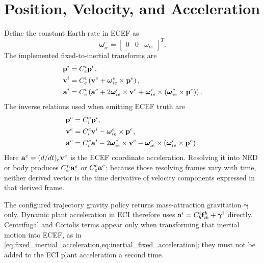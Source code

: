 \section{Position, Velocity, and Acceleration}

Define the constant Earth rate in ECEF as
\begin{equation}
\boldsymbol{\omega}_{ie}^{e}
=
\begin{bmatrix}0&0&\omega_{ie}\end{bmatrix}^{T}.
\end{equation}
The implemented fixed-to-inertial transforms are
\begin{align}
\mathbf{p}^{i}
&=C_e^i\mathbf{p}^{e},
\label{eq:fixed_inertial_position}\\
\mathbf{v}^{i}
&=C_e^i
  \left(\mathbf{v}^{e}+\boldsymbol{\omega}_{ie}^{e}\times\mathbf{p}^{e}\right),
\label{eq:fixed_inertial_velocity}\\
\mathbf{a}^{i}
&=C_e^i
  \left(
      \mathbf{a}^{e}
      +2\boldsymbol{\omega}_{ie}^{e}\times\mathbf{v}^{e}
      +\boldsymbol{\omega}_{ie}^{e}\times
        \left(\boldsymbol{\omega}_{ie}^{e}\times\mathbf{p}^{e}\right)
  \right).
\label{eq:fixed_inertial_acceleration}
\end{align}
The inverse relations used when emitting ECEF truth are
\begin{align}
\mathbf{p}^{e}
&=C_i^e\mathbf{p}^{i},
\label{eq:inertial_fixed_position}\\
\mathbf{v}^{e}
&=C_i^e\mathbf{v}^{i}
  -\boldsymbol{\omega}_{ie}^{e}\times\mathbf{p}^{e},
\label{eq:inertial_fixed_velocity}\\
\mathbf{a}^{e}
&=C_i^e\mathbf{a}^{i}
  -2\boldsymbol{\omega}_{ie}^{e}\times\mathbf{v}^{e}
  -\boldsymbol{\omega}_{ie}^{e}\times
    \left(\boldsymbol{\omega}_{ie}^{e}\times\mathbf{p}^{e}\right).
\label{eq:inertial_fixed_acceleration}
\end{align}
Here $\mathbf{a}^{e}=(d/dt)_e\mathbf{v}^{e}$ is the ECEF coordinate acceleration.
Resolving it into NED or body produces $C_e^n\mathbf{a}^{e}$ or
$C_e^b\mathbf{a}^{e}$; because those resolving frames vary with time, neither
derived vector is the time derivative of velocity components expressed in
that derived frame.

The configured trajectory gravity policy returns mass-attraction gravitation
$\boldsymbol{\gamma}$ only. Dynamic plant acceleration in ECI therefore uses
$\mathbf{a}^i=C_b^i\mathbf{f}_{ib}^{b}+\boldsymbol{\gamma}^{i}$ directly. Centrifugal and
Coriolis terms appear only when transforming that inertial motion into ECEF,
as in
\cref{eq:fixed_inertial_acceleration,eq:inertial_fixed_acceleration}; they
must not be added to the ECI plant acceleration a second time.

